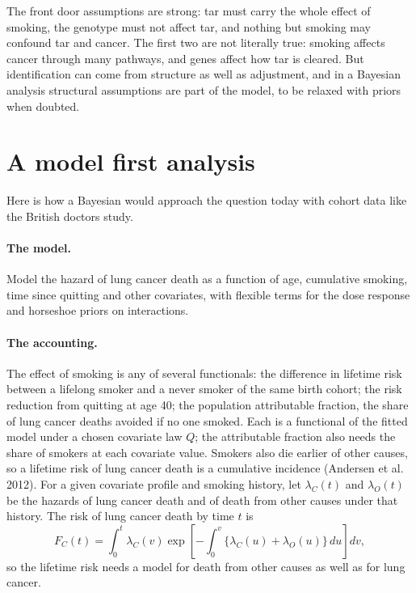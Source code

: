 The front door assumptions are strong: tar must carry the whole effect of smoking, the genotype must not affect tar, and nothing but smoking may confound tar and cancer. The first two are not literally true: smoking affects cancer through many pathways, and genes affect how tar is cleared. But identification can come from structure as well as adjustment, and in a Bayesian analysis structural assumptions are part of the model, to be relaxed with priors when doubted.

\section{A model first analysis}

Here is how a Bayesian would approach the question today with cohort data like the British doctors study.

\paragraph{The model.} Model the hazard of lung cancer death as a function of age, cumulative smoking, time since quitting and other covariates, with flexible terms for the dose response and horseshoe priors on interactions. 

\paragraph{The accounting.} The effect of smoking is any of several functionals: the difference in lifetime risk between a lifelong smoker and a never smoker of the same birth cohort; the risk reduction from quitting at age 40; the population attributable fraction, the share of lung cancer deaths avoided if no one smoked. Each is a functional of the fitted model under a chosen covariate law $Q$; the attributable fraction also needs the share of smokers at each covariate value. Smokers also die earlier of other causes, so a lifetime risk of lung cancer death is a cumulative incidence (Andersen et al. 2012). For a given covariate profile and smoking history, let $\lambda_C(t)$ and $\lambda_O(t)$ be the hazards of lung cancer death and of death from other causes under that history. The risk of lung cancer death by time $t$ is
\[
F_C(t)=\int_0^t \lambda_C(v)\exp\left[-\int_0^v\{\lambda_C(u)+\lambda_O(u)\}\,du\right]dv,
\]
so the lifetime risk needs a model for death from other causes as well as for lung cancer.

